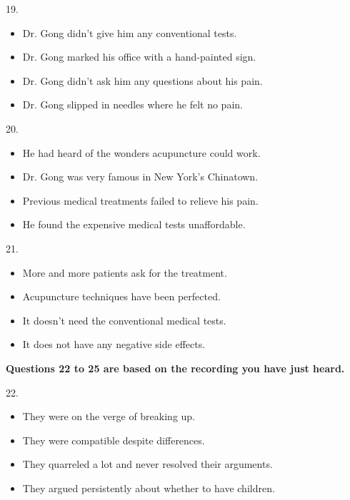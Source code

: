 \documentclass[UTF8,11pt]{ctexart}
\begin{document}
19.


\begin{itemize}[leftmargin=2em,itemsep=.2em,topsep=.4em]\item[A.] Dr. Gong didn’t give him any conventional tests.
\item[B.] Dr. Gong marked his office with a hand-painted sign.
\item[C.] Dr. Gong didn’t ask him any questions about his pain.
\item[D.] Dr. Gong slipped in needles where he felt no pain.
\end{itemize}

20.


\begin{itemize}[leftmargin=2em,itemsep=.2em,topsep=.4em]\item[A.] He had heard of the wonders acupuncture could work.
\item[B.] Dr. Gong was very famous in New York’s Chinatown.
\item[C.] Previous medical treatments failed to relieve his pain.
\item[D.] He found the expensive medical tests unaffordable.
\end{itemize}

21.


\begin{itemize}[leftmargin=2em,itemsep=.2em,topsep=.4em]\item[A.] More and more patients ask for the treatment.
\item[B.] Acupuncture techniques have been perfected.
\item[C.] It doesn’t need the conventional medical tests.
\item[D.] It does not have any negative side effects.
\end{itemize}

\textbf{Questions 22 to 25 are based on the recording you have just heard.}


22.


\begin{itemize}[leftmargin=2em,itemsep=.2em,topsep=.4em]\item[A.] They were on the verge of breaking up.
\item[B.] They were compatible despite differences.
\item[C.] They quarreled a lot and never resolved their arguments.
\item[D.] They argued persistently about whether to have children.
\end{itemize}
\end{document}

